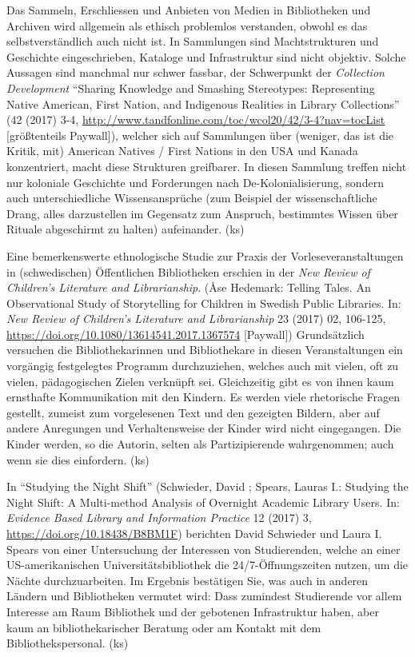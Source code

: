 \documentclass[a4paper,
fontsize=11pt,
oneside,
numbers=noperiodatend,
parskip=half-,
bibliography=totoc,
final
]{scrartcl}
\begin{document}
Das Sammeln, Erschliessen und Anbieten von Medien in Bibliotheken und
Archiven wird allgemein als ethisch problemlos verstanden, obwohl es das
selbstverständlich auch nicht ist. In Sammlungen sind Machtstrukturen
und Geschichte eingeschrieben, Kataloge und Infrastruktur sind nicht
objektiv. Solche Aussagen sind manchmal nur schwer fassbar, der
Schwerpunkt der \emph{Collection Development} \enquote{Sharing Knowledge
and Smashing Stereotypes: Representing Native American, First Nation,
and Indigenous Realities in Library Collections} (42 (2017) 3-4,
\url{http://www.tandfonline.com/toc/wcol20/42/3-4?nav=tocList}
{[}größtenteils Paywall{]}), welcher sich auf Sammlungen über (weniger,
das ist die Kritik, mit) American Natives / First Nations in den USA und
Kanada konzentriert, macht diese Strukturen greifbarer. In diesen
Sammlung treffen nicht nur koloniale Geschichte und Forderungen nach
De-Kolonialisierung, sondern auch unterschiedliche Wissensansprüche (zum
Beispiel der wissenschaftliche Drang, alles darzustellen im Gegensatz
zum Anspruch, bestimmtes Wissen über Rituale abgeschirmt zu halten)
aufeinander. (ks)

Eine bemerkenswerte ethnologische Studie zur Praxis der
Vorleseveranstaltungen in (schwedischen) Öffentlichen Bibliotheken
erschien in der \emph{New Review of Children's Literature and
Librarianship}. (Åse Hedemark: Telling Tales. An Observational Study of
Storytelling for Children in Swedish Public Libraries. In: \emph{New
Review of Children's Literature and Librarianship} 23 (2017) 02,
106-125, \url{https://doi.org/10.1080/13614541.2017.1367574}
{[}Paywall{]}) Grundsätzlich versuchen die Bibliothekarinnen und
Bibliothekare in diesen Veranstaltungen ein vorgängig festgelegtes
Programm durchzuziehen, welches auch mit vielen, oft zu vielen,
pädagogischen Zielen verknüpft sei. Gleichzeitig gibt es von ihnen kaum
ernsthafte Kommunikation mit den Kindern. Es werden viele rhetorische
Fragen gestellt, zumeist zum vorgelesenen Text und den gezeigten
Bildern, aber auf andere Anregungen und Verhaltensweise der Kinder wird
nicht eingegangen. Die Kinder werden, so die Autorin, selten als
Partizipierende wahrgenommen; auch wenn sie dies einfordern. (ks)

In \enquote{Studying the Night Shift} (Schwieder, David ; Spears, Lauras
I.: Studying the Night Shift: A Multi-method Analysis of Overnight
Academic Library Users. In: \emph{Evidence Based Library and Information
Practice} 12 (2017) 3, \url{https://doi.org/10.18438/B8BM1F}) berichten
David Schwieder und Laura I. Spears von einer Untersuchung der
Interessen von Studierenden, welche an einer US-amerikanischen
Universitätsbibliothek die 24/7-Öffnungszeiten nutzen, um die Nächte
durchzuarbeiten. Im Ergebnis bestätigen Sie, was auch in anderen Ländern
und Bibliotheken vermutet wird: Dass zumindest Studierende vor allem
Interesse am Raum Bibliothek und der gebotenen Infrastruktur haben, aber
kaum an bibliothekarischer Beratung oder am Kontakt mit dem
Bibliothekspersonal. (ks)
\end{document}
